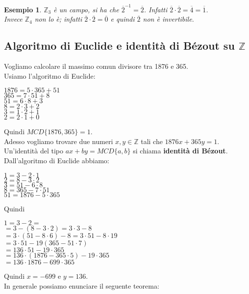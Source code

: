 \documentclass[a4paper,12pt]{article}
\theoremstyle{def}
\theoremstyle{prop}
\theoremstyle{esempio}
\newtheorem*{example}{Esempio}
\theoremstyle{dimostrazione}
\theoremstyle{teo}
\theoremstyle{osservazione}
\begin{document}
\begin{example}
	\(\mathbb{Z}_3\) è un campo, si ha che \(\overline{2}^{-1} = \overline{2}\). Infatti
	\(\overline{2} \cdot \overline{2} = \overline{4} = \overline{1}\).\\Invece \(\mathbb{Z}_4\) non lo è;
	infatti \(\overline{2} \cdot \overline{2} = \overline{0}\) e quindi \(\overline{2}\) non è invertibile.
\end{example}


\subsection{Algoritmo di Euclide e identità di Bézout su \(\mathbb{Z}\)}

Vogliamo calcolare il massimo comun divisore tra 1876 e 365.\\
Usiamo l'algoritmo di Euclide: \\
\begin{center}
	\(1876 = 5 \cdot 365 + 51\)\\
	\(365 = 7 \cdot 51 + 8\)\\
	\(51 = 6 \cdot 8 + 3\)\\
	\(8 = 2 \cdot 3 + 2\)\\
	\(3 = 1 \cdot 2 + 1\)\\
	\(2 = 2 \cdot 1 + 0\)\\
\end{center}

Quindi \(MCD \{1876,365\} = 1\).\\
Adesso vogliamo trovare due numeri \(x,y \in \mathbb{Z} \) tali che \(1876x + 365y = 1\).\\
Un'identità del tipo \(ax + by = MCD \{a,b\}\) si chiama \textbf{identità di Bézout}.\\
Dall'algoritmo di Euclide abbiamo:
\begin{center}
	\(1 = 3 - 2 \cdot 1\)\\
	\(2 = 8 - 3 \cdot 2\)\\
	\(3 = 51 - 6 \cdot 8\)\\
	\(8 = 365 - 7 \cdot 51\)\\
	\(51 = 1876 - 5 \cdot 365\)\\
\end{center}
Quindi\\
\begin{center}
	\(1 = 3 - 2 =\)\\
	\(= 3 - (8 - 3 \cdot 2) = 3 \cdot 3 - 8\)\\
	\(= 3 \cdot (51 - 8 \cdot 6) - 8 = 3 \cdot 51 - 8 \cdot 19\)\\
	\(= 3 \cdot 51 - 19(365 - 51 \cdot 7)\)\\
	\(= 136 \cdot 51 - 19 \cdot 365\)\\
	\(= 136 \cdot (1876 - 365 \cdot 5) - 19 \cdot 365\)\\
	\(= 136 \cdot 1876 - 699 \cdot 365\)\\
\end{center}
Quindi \(x = -699\) e \(y = 136\).\\
In generale possiamo enunciare il seguente teorema:
\end{document}
